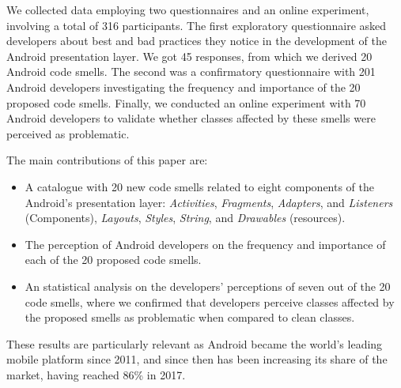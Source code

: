 We collected data employing two questionnaires and an online experiment, involving a total of 316 participants. The first exploratory questionnaire asked developers about best and bad practices they notice in the development of the Android presentation layer. We got 45 responses, from which we derived 20 Android code smells. The second was a confirmatory questionnaire with 201 Android developers investigating the frequency and importance of the 20 proposed code smells. Finally, we conducted an online experiment with 70 Android developers to validate whether classes affected by these smells were perceived as problematic.


The main contributions of this paper are:

\begin{itemize}
  \item A catalogue with 20 new code smells related to eight components of the Android's presentation layer: \textit{Activities}, \textit{Fragments}, \textit{Adapters}, and \textit{Listeners} (Components), \textit{Layouts}, \textit{Styles}, \textit{String}, and \textit{Drawables} (resources).
  
  \item The perception of Android developers on the frequency and importance of each of the 20 proposed code smells.

  \item An statistical analysis on the developers' perceptions of seven out of the 20 code smells, where we confirmed that developers perceive classes affected by the proposed smells as problematic when compared to clean classes.
\end{itemize}

These results are particularly relevant as Android became the world's leading mobile platform since 2011, and since then has been increasing its share of the market, having reached 86\% \cite{GlobalSmartphoneSales:09-17} in 2017. 


